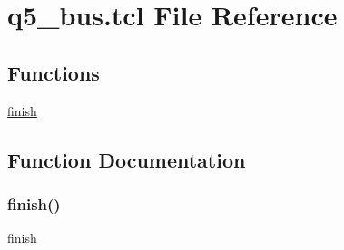\hypertarget{q5__bus_8tcl}{}\section{q5\+\_\+bus.\+tcl File Reference}
\label{q5__bus_8tcl}
\subsection*{Functions}
\begin{DoxyCompactItemize}
\item 
\hyperlink{q5__bus_8tcl_a30728837c246b65ef76298af0101d99c}{finish}
\end{DoxyCompactItemize}


\subsection{Function Documentation}
\mbox{\label{q5__bus_8tcl_a30728837c246b65ef76298af0101d99c}} 
\subsubsection{\texorpdfstring{finish()}{finish()}}
{\footnotesize\ttfamily finish}

